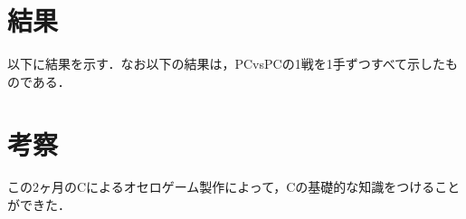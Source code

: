 \documentclass[a4j]{jarticle}
\begin{document}
\section{結果}
以下に結果を示す．なお以下の結果は，PCvsPCの1戦を1手ずつすべて示したものである．\\



\section{考察}
この2ヶ月のCによるオセロゲーム製作によって，Cの基礎的な知識をつけることができた．
\end{document}
